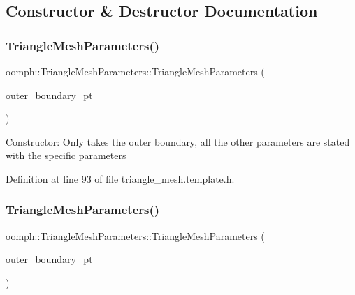 \subsection{Constructor \& Destructor Documentation}
\mbox{\label{classoomph_1_1TriangleMeshParameters_ac8e4f397da81bbeaf03aaea8ce85272c}} 
\subsubsection{\texorpdfstring{Triangle\+Mesh\+Parameters()}{TriangleMeshParameters()}\hspace{0.1cm}{\footnotesize\ttfamily [1/3]}}
{\footnotesize\ttfamily oomph\+::\+Triangle\+Mesh\+Parameters\+::\+Triangle\+Mesh\+Parameters (\begin{DoxyParamCaption}\item[{Vector$<$ Triangle\+Mesh\+Closed\+Curve $\ast$$>$ \&}]{outer\+\_\+boundary\+\_\+pt }\end{DoxyParamCaption})\hspace{0.3cm}{\ttfamily [inline]}}

Constructor\+: Only takes the outer boundary, all the other parameters are stated with the specific parameters 

Definition at line 93 of file triangle\+\_\+mesh.\+template.\+h.

\mbox{\label{classoomph_1_1TriangleMeshParameters_a674b9be72cdd5c72877f07b434882704}} 
\subsubsection{\texorpdfstring{Triangle\+Mesh\+Parameters()}{TriangleMeshParameters()}\hspace{0.1cm}{\footnotesize\ttfamily [2/3]}}
{\footnotesize\ttfamily oomph\+::\+Triangle\+Mesh\+Parameters\+::\+Triangle\+Mesh\+Parameters (\begin{DoxyParamCaption}\item[{Triangle\+Mesh\+Closed\+Curve $\ast$}]{outer\+\_\+boundary\+\_\+pt }\end{DoxyParamCaption})\hspace{0.3cm}{\ttfamily [inline]}}

